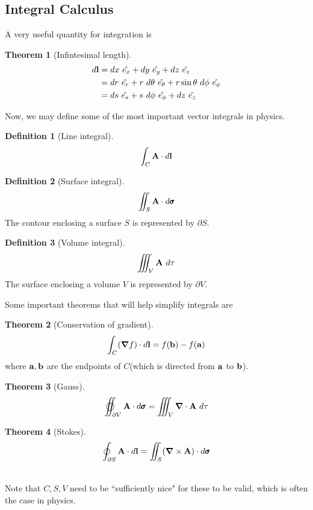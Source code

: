 \documentclass[10pt, a4paper]{extarticle}
\theoremstyle{definition}
\newtheorem{thm}{Theorem}
\newtheorem{defn}{Definition}
\begin{document}
\subsection{Integral Calculus}
A very useful quantity for integration is
\begin{framed}
	\begin{thm}[Infintesimal length]
	\begin{align*}
		d\vb{l}&=dx\ \hat{e_x}+dy\ \hat{e_y}+dz\ \hat{e_z}\\
			   &=dr\ \hat{e_r}+r\ d\theta\ \hat{e_\theta}+r\sin\theta\ d\phi\ \hat{e_\phi}\\
			   &=ds\ \hat{e_s}+s\ d\phi\ \hat{e_\phi}+dz\ \hat{e_z}
	\end{align*}
\end{thm}
\end{framed}
Now, we may define some of the most important vector integrals in physics.
\begin{framed}
\begin{defn}[Line integral]
	\[\int_C \vb{A}\cdot d\vb{l}\]
\end{defn}

\begin{defn}[Surface integral]
	\[\iint_S \vb{A}\cdot d\pmb{\sigma}\]
	The contour enclosing a surface $S$ is represented by $\partial S$.
\end{defn}

\begin{defn}[Volume integral]
	\[\iiint_V \vb{A}\ d\tau\]
	The surface enclosing a volume $V$ is represented by $\partial V$.
\end{defn}
\end{framed}

Some important theorems that will help simplify integrals are
\begin{framed}
	\begin{thm}[Conservation of gradient]
		\[\int_C(\grad f)\cdot d\vb{l}=f(\vb{b})-f(\vb{a})\]
		where $\vb{a}, \vb{b}$ are the endpoints of $C$(which is directed from $\vb{a}$ to $\vb{b}$).
	\end{thm}
	\begin{thm}[Gauss]
		\[\varoiint_{\partial V} \vb{A}\cdot d\pmb{\sigma}=\iiint_V \grad\cdot \vb{A}\ d\tau\]
	\end{thm}

	\begin{thm}[Stokes]
		\[\oint_{\partial S} \vb{A}\cdot d\vb{l}=\iint_S (\grad\times\vb{A})\cdot d\pmb{\sigma}\]
	\end{thm}
	\hfill\\
	Note that $C,S,V$ need to be ``sufficiently nice" for these to be valid, which is often the case in physics.
\end{framed}
\end{document}
